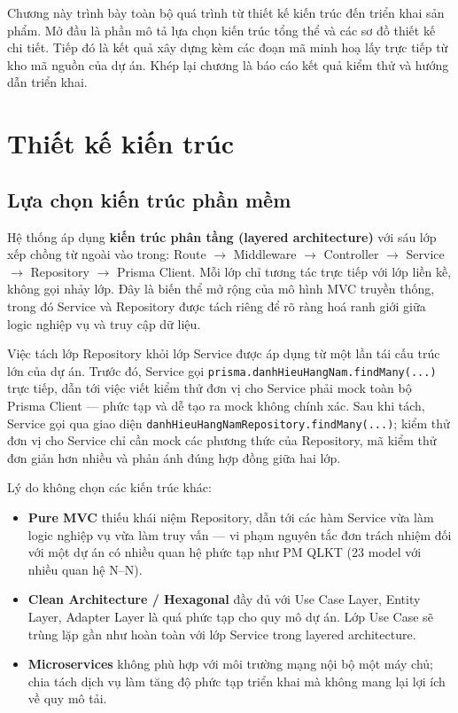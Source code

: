 \documentclass[../DoAn.tex]{subfiles}
\begin{document}
Chương này trình bày toàn bộ quá trình từ thiết kế kiến trúc đến triển khai sản phẩm. Mở đầu là phần mô tả lựa chọn kiến trúc tổng thể và các sơ đồ thiết kế chi tiết. Tiếp đó là kết quả xây dựng kèm các đoạn mã minh hoạ lấy trực tiếp từ kho mã nguồn của dự án. Khép lại chương là báo cáo kết quả kiểm thử và hướng dẫn triển khai.

\section{Thiết kế kiến trúc}
\label{section:4.1}

\subsection{Lựa chọn kiến trúc phần mềm}
\label{subsection:4.1.1}

Hệ thống áp dụng \textbf{kiến trúc phân tầng (layered architecture)} với sáu lớp xếp chồng từ ngoài vào trong: Route $\rightarrow$ Middleware $\rightarrow$ Controller $\rightarrow$ Service $\rightarrow$ Repository $\rightarrow$ Prisma Client. Mỗi lớp chỉ tương tác trực tiếp với lớp liền kề, không gọi nhảy lớp. Đây là biến thể mở rộng của mô hình MVC truyền thống, trong đó Service và Repository được tách riêng để rõ ràng hoá ranh giới giữa logic nghiệp vụ và truy cập dữ liệu.

Việc tách lớp Repository khỏi lớp Service được áp dụng từ một lần tái cấu trúc lớn của dự án. Trước đó, Service gọi \texttt{prisma.danhHieuHangNam.findMany(...)} trực tiếp, dẫn tới việc viết kiểm thử đơn vị cho Service phải mock toàn bộ Prisma Client --- phức tạp và dễ tạo ra mock không chính xác. Sau khi tách, Service gọi qua giao diện \texttt{danhHieuHangNamRepository.findMany(...)}; kiểm thử đơn vị cho Service chỉ cần mock các phương thức của Repository, mã kiểm thử đơn giản hơn nhiều và phản ánh đúng hợp đồng giữa hai lớp.

Lý do không chọn các kiến trúc khác:

\begin{itemize}
    \item \textbf{Pure MVC} thiếu khái niệm Repository, dẫn tới các hàm Service vừa làm logic nghiệp vụ vừa làm truy vấn --- vi phạm nguyên tắc đơn trách nhiệm đối với một dự án có nhiều quan hệ phức tạp như PM QLKT (23 model với nhiều quan hệ N--N).
    \item \textbf{Clean Architecture / Hexagonal} đầy đủ với Use Case Layer, Entity Layer, Adapter Layer là quá phức tạp cho quy mô dự án. Lớp Use Case sẽ trùng lặp gần như hoàn toàn với lớp Service trong layered architecture.
    \item \textbf{Microservices} không phù hợp với môi trường mạng nội bộ một máy chủ; chia tách dịch vụ làm tăng độ phức tạp triển khai mà không mang lại lợi ích về quy mô tải.
\end{itemize}
\end{document}
